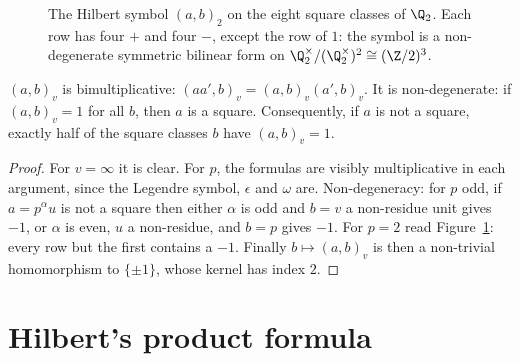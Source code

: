 \begin{figure}[ht]
\centering
{}
\caption{The Hilbert symbol $(a,b)_2$ on the eight square classes of $\Q_2$. Each row has four $+$ and four $-$, except the
row of $1$: the symbol is a non-degenerate symmetric bilinear form on $\Q_2^\times/(\Q_2^\times)^2\cong(\Z/2)^3$.}
\label{fig:hilbert2}
\end{figure}

\begin{corollary}\label{cor:hilbertbilinear}
$(a,b)_v$ is bimultiplicative: $(aa',b)_v=(a,b)_v(a',b)_v$. It is non-degenerate: if $(a,b)_v=1$ for all $b$, then $a$ is a
square. Consequently, if $a$ is not a square, exactly half of the square classes $b$ have $(a,b)_v=1$.
\end{corollary}
\begin{proof}
For $v=\infty$ it is clear. For $p$, the formulas are visibly multiplicative in each argument, since the Legendre symbol,
$\epsilon$ and $\omega$ are. Non-degeneracy: for $p$ odd, if $a=p^\alpha u$ is not a square then either $\alpha$ is odd and
$b=v$ a non-residue unit gives $-1$, or $\alpha$ is even, $u$ a non-residue, and $b=p$ gives $-1$. For $p=2$ read
Figure~\ref{fig:hilbert2}: every row but the first contains a $-1$. Finally $b\mapsto(a,b)_v$ is then a non-trivial
homomorphism to $\{\pm1\}$, whose kernel has index $2$.
\end{proof}

\section{Hilbert's product formula}


